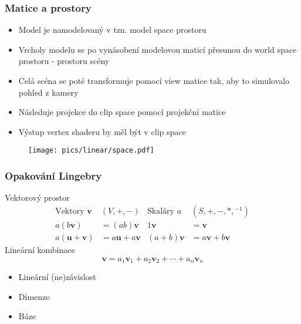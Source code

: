 \newcommand{\V}[1]{\ensuremath{\mathbf{#1}}}
\newcommand{\NV}[1]{\ensuremath{\mathbf{\hat{#1}}}}

\begin{frame}
\frametitle{Matice a prostory}
	\begin{itemize}
		\item Model je namodelovaný v tzn. model space prostoru
    \item Vrcholy modelu se po vynásobení modelovou maticí přesunou do world space prostoru - prostoru scény
    \item Celá scéna se poté transformuje pomocí view matice tak, aby to simulovalo pohled z kamery
    \item Následuje projekce do clip space pomocí projekční matice
    \item Výstup vertex shaderu by měl být v clip space
	\end{itemize}
  \begin{figure}[h]
    \texttt{[image: pics/linear/space.pdf]}
  \end{figure}
\end{frame}


\begin{frame}
  \frametitle{Opakování Lingebry}
  Vektorový prostor
  \pause
  \begin{align*}
    \text{Vektory }\V{v}&(V,+,-) &
    \text{Skaláry }a&(S,+,-,*,{}^{-1})\\
    a(b\V{v}) &= (ab)\V{v} & 1\V{v} &= \V{v} \\
    a(\V{u}+\V{v}) &= a\V{u} + a\V{v} & (a+b)\V{v} &= a\V{v} + b\V{v}
  \end{align*}
  \pause
  Lineární kombinace
  \pause
  \begin{equation*}
    \V{v} = a_1\V{v}_1 + a_2\V{v}_2 + \dotsb + a_n\V{v}_n
  \end{equation*}
  \pause
  \begin{itemize}
    \item Lineární (ne)závislost
    \item Dimenze
    \item Báze
  \end{itemize}
\end{frame}

